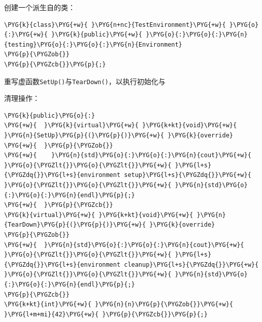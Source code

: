 创建一个派生自的类：



\begin{codeblockbg}
\begin{Verbatim}[commandchars=\\\{\},breaklines=true,breakanywhere=true,fontsize=\codefont,xleftmargin=17bp]
\PYG{k}{class}\PYG{+w}{ }\PYG{n+nc}{TestEnvironment}\PYG{+w}{ }\PYG{o}{:}\PYG{+w}{ }\PYG{k}{public}\PYG{+w}{ }\PYG{o}{:}\PYG{o}{:}\PYG{n}{testing}\PYG{o}{:}\PYG{o}{:}\PYG{n}{Environment}
\PYG{p}{\PYGZob{}}
\PYG{p}{\PYGZcb{}}\PYG{p}{;}
\end{Verbatim}
\end{codeblockbg}



重写虚函数\texttt{SetUp()}与\texttt{TearDown()}，以执行初始化与



清理操作：



\begin{codeblockbg}
\begin{Verbatim}[commandchars=\\\{\},breaklines=true,breakanywhere=true,fontsize=\codefont,xleftmargin=17bp]
\PYG{k}{public}\PYG{o}{:}
\PYG{+w}{  }\PYG{k}{virtual}\PYG{+w}{ }\PYG{k+kt}{void}\PYG{+w}{ }\PYG{n}{SetUp}\PYG{p}{(}\PYG{p}{)}\PYG{+w}{ }\PYG{k}{override}
\PYG{+w}{  }\PYG{p}{\PYGZob{}}
\PYG{+w}{    }\PYG{n}{std}\PYG{o}{:}\PYG{o}{:}\PYG{n}{cout}\PYG{+w}{ }\PYG{o}{\PYGZlt{}}\PYG{o}{\PYGZlt{}}\PYG{+w}{ }\PYG{l+s}{\PYGZdq{}}\PYG{l+s}{environment setup}\PYG{l+s}{\PYGZdq{}}\PYG{+w}{ }\PYG{o}{\PYGZlt{}}\PYG{o}{\PYGZlt{}}\PYG{+w}{ }\PYG{n}{std}\PYG{o}{:}\PYG{o}{:}\PYG{n}{endl}\PYG{p}{;}
\PYG{+w}{  }\PYG{p}{\PYGZcb{}}
\PYG{k}{virtual}\PYG{+w}{ }\PYG{k+kt}{void}\PYG{+w}{ }\PYG{n}{TearDown}\PYG{p}{(}\PYG{p}{)}\PYG{+w}{ }\PYG{k}{override}
\PYG{p}{\PYGZob{}}
\PYG{+w}{  }\PYG{n}{std}\PYG{o}{:}\PYG{o}{:}\PYG{n}{cout}\PYG{+w}{ }\PYG{o}{\PYGZlt{}}\PYG{o}{\PYGZlt{}}\PYG{+w}{ }\PYG{l+s}{\PYGZdq{}}\PYG{l+s}{environment cleanup}\PYG{l+s}{\PYGZdq{}}\PYG{+w}{ }\PYG{o}{\PYGZlt{}}\PYG{o}{\PYGZlt{}}\PYG{+w}{ }\PYG{n}{std}\PYG{o}{:}\PYG{o}{:}\PYG{n}{endl}\PYG{p}{;}
\PYG{p}{\PYGZcb{}}
\PYG{k+kt}{int}\PYG{+w}{ }\PYG{n}{n}\PYG{p}{\PYGZob{}}\PYG{+w}{ }\PYG{l+m+mi}{42}\PYG{+w}{ }\PYG{p}{\PYGZcb{}}\PYG{p}{;}
\end{Verbatim}
\end{codeblockbg}


